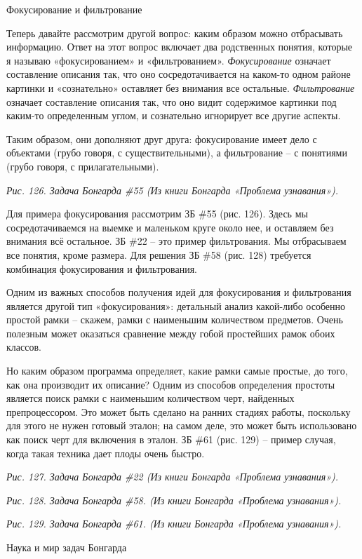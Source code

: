 \documentclass[../main.tex]{subfiles}
\begin{document}
Фокусирование и фильтрование

Теперь давайте рассмотрим другой вопрос: каким образом можно отбрасывать информацию. Ответ на этот вопрос включает два родственных понятия, которые я называю «фокусированием» и «фильтрованием». \emph{Фокусирование} означает составление описания так, что оно сосредотачивается на каком-то одном районе картинки и «сознательно» оставляет без внимания все остальные. \emph{Фильтрование} означает составление описания так, что оно видит содержимое картинки под каким-то определенным углом, и сознательно игнорирует все другие аспекты.

Таким образом, они дополняют друг друга: фокусирование имеет дело с объектами (грубо говоря, с существительными), а фильтрование \--- с понятиями (грубо говоря, с прилагательными).

\emph{Рис. 126. Задача Бонгарда \#55 (Из книги Бонгарда «Проблема узнавания»).}

Для примера фокусирования рассмотрим ЗБ \#55 (рис. 126). Здесь мы сосредотачиваемся на выемке и маленьком круге около нее, и оставляем без внимания всё остальное. ЗБ \#22 \--- это пример фильтрования. Мы отбрасываем все понятия, кроме размера. Для решения ЗБ \#58 (рис. 128) требуется комбинация фокусирования и фильтрования.

Одним из важных способов получения идей для фокусирования и фильтрования является другой тип «фокусирования»: детальный анализ какой-либо особенно простой рамки \--- скажем, рамки с наименьшим количеством предметов. Очень полезным может оказаться сравнение между гобой простейших рамок обоих классов.

Но каким образом программа определяет, какие рамки самые простые, до того, как она производит их описание? Одним из способов определения простоты является поиск рамки с наименьшим количеством черт, найденных препроцессором. Это может быть сделано на ранних стадиях работы, поскольку для этого не нужен готовый эталон; на самом деле, это может быть использовано как поиск черт для включения в эталон. ЗБ \#61 (рис. 129) \--- пример случая, когда такая техника дает плоды очень быстро.

\emph{Рис. 127. Задача Бонгарда \#22 (Из книги Бонгарда «Проблема узнавания»).}

\emph{Рис. 128. Задача Бонгарда \#58. (Из книги Бонгарда «Проблема узнавания»).}

\emph{Рис. 129. Задача Бонгарда \#61. (Из книги Бонгарда «Проблема узнавания»).}

Наука и мир задач Бонгарда
\end{document}
